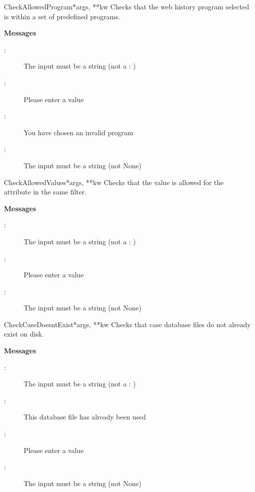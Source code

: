 \documentclass[letterpaper,10pt,english]{manual}
\begin{document}
\hypertarget{webscavator.forms.validators.CheckAllowedProgram}{}\begin{classdesc}{CheckAllowedProgram}{*args, **kw}
Checks that the web history program selected is within a set of predefined programs.

\textbf{Messages}
\begin{description}
\item[:]
The input must be a string (not a : )

\item[:]
Please enter a value

\item[:]
You have chosen an invalid program

\item[:]
The input must be a string (not None)

\end{description}
\end{classdesc}

\hypertarget{webscavator.forms.validators.CheckAllowedValues}{}\begin{classdesc}{CheckAllowedValues}{*args, **kw}
Checks that the value is allowed for the attribute in the same filter.

\textbf{Messages}
\begin{description}
\item[:]
The input must be a string (not a : )

\item[:]
Please enter a value

\item[:]
The input must be a string (not None)

\end{description}
\end{classdesc}

\hypertarget{webscavator.forms.validators.CheckCaseDoesntExist}{}\begin{classdesc}{CheckCaseDoesntExist}{*args, **kw}
Checks that case database files do not already exist on disk.

\textbf{Messages}
\begin{description}
\item[:]
The input must be a string (not a : )

\item[:]
This database file has already been used

\item[:]
Please enter a value

\item[:]
The input must be a string (not None)

\end{description}
\end{classdesc}
\end{document}
